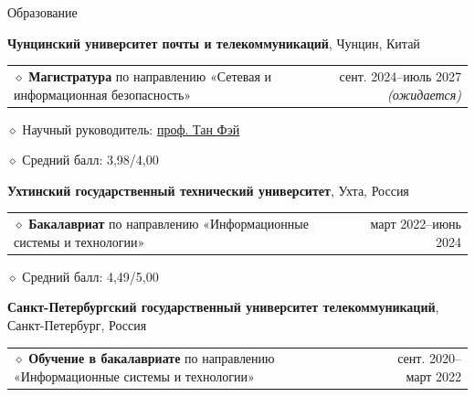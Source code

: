 \documentclass[11pt,a4paper]{article}
\makeatletter
\newcommand{\cvrow}[2]{%
  \noindent
  \begin{minipage}[t]{0.145\textwidth}
    \vspace{0pt}%
    \raggedright
    \fontsize{10.5}{12.5}\selectfont
    #1
  \end{minipage}%
  \hfill
  \begin{minipage}[t]{0.835\textwidth}
    \vspace{0pt}%
    #2
  \end{minipage}\par
}
\newcommand{\eduentry}[2]{%
  \noindent
  \begin{tabularx}{\linewidth}
    {@{}X@{\hspace{0.8em}}r@{}}
    #1 & \small #2
  \end{tabularx}\par
  \vspace{0.15em}
}
\newcommand{\edudetail}[1]{%
  \noindent\hspace*{1.15em}$\diamond$ #1\par
}
\makeatother
\begin{document}
\vspace{0.75em}

\cvrow{Образование}{%
  \raggedright

  \textbf{Чунцинский университет почты и телекоммуникаций},
  Чунцин, Китай\par
  \vspace{0.12em}

  \eduentry
    {$\diamond$ \textbf{Магистратура} по направлению «Сетевая и информационная безопасность»}
    {сент. 2024--июль 2027 \textit{(ожидается)}}

  \edudetail{Научный руководитель:
    \href{https://faculty.cqupt.edu.cn/tangfei/en/index.htm}{проф. Тан Фэй}}
  \edudetail{Средний балл: 3,98/4,00}

  \vspace{0.48em}

  \textbf{Ухтинский государственный технический университет},
  Ухта, Россия\par
  \vspace{0.12em}

  \eduentry
    {$\diamond$ \textbf{Бакалавриат} по направлению «Информационные системы и технологии»}
    {март 2022--июнь 2024}

  \edudetail{Средний балл: 4,49/5,00}

  \vspace{0.48em}

  \textbf{Санкт-Петербургский государственный университет телекоммуникаций},
  Санкт-Петербург, Россия\par
  \vspace{0.12em}

  \eduentry
    {$\diamond$ \textbf{Обучение в бакалавриате} по направлению
    «Информационные системы и технологии»}
    {сент. 2020--март 2022}
}

\vspace{0.75em}
\end{document}

